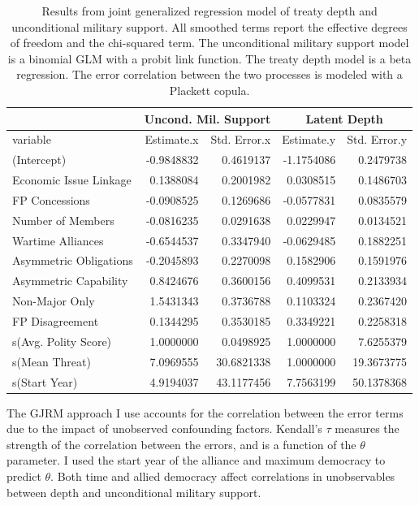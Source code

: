 \documentclass[12pt]{article}
\begin{document}
\begin{table}[ht]
\centering
\begin{tabular}{lrrrr}
  & \multicolumn{2}{c}{Uncond. Mil. Support} & \multicolumn{2}{c}{Latent Depth}\\ \hline
variable & Estimate.x & Std. Error.x & Estimate.y & Std. Error.y \\ 
  \hline
(Intercept) & -0.9848832 & 0.4619137 & -1.1754086 & 0.2479738 \\ 
  Economic Issue Linkage & 0.1388084 & 0.2001982 & 0.0308515 & 0.1486703 \\ 
  FP Concessions & -0.0908525 & 0.1269686 & -0.0577831 & 0.0835579 \\ 
  Number of Members & -0.0816235 & 0.0291638 & 0.0229947 & 0.0134521 \\ 
  Wartime Alliances & -0.6544537 & 0.3347940 & -0.0629485 & 0.1882251 \\ 
  Asymmetric Obligations & -0.2045893 & 0.2270098 & 0.1582906 & 0.1591976 \\ 
  Asymmetric Capability & 0.8424676 & 0.3600156 & 0.4099531 & 0.2133934 \\ 
  Non-Major Only & 1.5431343 & 0.3736788 & 0.1103324 & 0.2367420 \\ 
  FP Disagreement & 0.1344295 & 0.3530185 & 0.3349221 & 0.2258318 \\ 
  s(Avg. Polity Score) & 1.0000000 & 0.0498925 & 1.0000000 & 7.6255379 \\ 
  s(Mean Threat) & 7.0969555 & 30.6821338 & 1.0000000 & 19.3673775 \\ 
  s(Start Year) & 4.9194037 & 43.1177456 & 7.7563199 & 50.1378368 \\ 
   \hline
\end{tabular}
\caption{Results from joint generalized regression model of treaty depth and unconditional military support. 
                     All smoothed terms report the effective degrees of freedom and the chi-squared term. 
                     The unconditional military support model is a binomial GLM with a probit link function. 
                     The treaty depth model is a beta regression. 
                     The error correlation between the two processes is modeled with a Plackett copula.} 
\label{tab:gjrm-res}
\end{table}


The GJRM approach I use accounts for the correlation between the error terms due to the impact of unobserved confounding factors. 
Kendall's $\tau$ measures the strength of the correlation between the errors, and is a function of the $\theta$ parameter.
I used the start year of the alliance and maximum democracy to predict $\theta$. 
Both time and allied democracy affect correlations in unobservables between depth and unconditional military support. 
\end{document}
